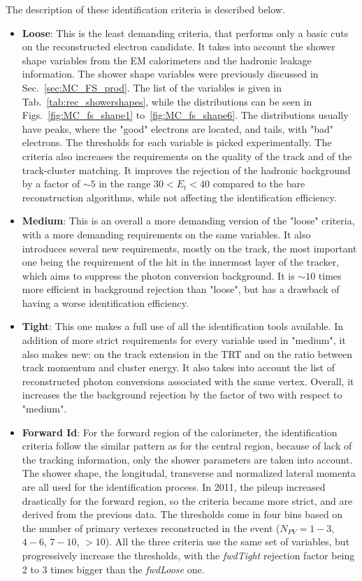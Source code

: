The description of these identification criteria is described below.
\begin{itemize}
\item {\bfseries Loose}: This is the least demanding criteria, that performs only a basic cuts on the reconstructed electron candidate. It takes into account the shower shape variables from the EM calorimeters and the hadronic leakage information. The shower shape variables were previously discussed in Sec.~\ref{sec:MC_FS_prod}. The list of the variables is given in Tab.~\ref{tab:rec_showershapes}, while the distributions can be seen in Figs.~\ref{fig:MC_fs_shape1} to~\ref{fig:MC_fs_shape6}. The distributions usually have peaks, where the "good" electrons are located, and tails, with "bad" electrons. The thresholds for each variable is picked experimentally. The criteria also increases the requirements on the quality of the track and of the track-cluster matching. It improves the rejection of the hadronic background by a factor of $\sim 5$ in the range $30 < E_{t} < 40$ compared to the bare reconstruction algorithms, while not affecting the identification efficiency.
\item {\bfseries Medium}: This is an overall a more demanding version of the "loose" criteria, with a more demanding requirements on the same variables. It also introduces several new requirements, mostly on the track, the most important one being the requirement of the hit in the innermost layer of the tracker, which aims to suppress the photon conversion background. It is $\sim 10$ times more efficient in background rejection than "loose", but has a drawback of having a worse identification efficiency.
\item {\bfseries Tight}: This one makes a full use of all the identification tools available. In addition of more strict requirements for every variable used in "medium", it also makes new: on the track extension in the TRT and on the ratio between track momentum and cluster energy. It also takes into account the list of reconstructed photon conversions associated with the same vertex. Overall, it increases the the background rejection by the factor of two with respect to "medium".
\item {\bfseries Forward Id}: For the forward region of the calorimeter, the identification criteria follow the similar pattern as for the central region, because of lack of the tracking information, only the shower parameters are taken into account. The shower shape, the longitudal, transverse and normalized lateral momenta are all used for the identification process. In 2011, the pileup increased drastically for the forward region, so the criteria became more strict, and are derived from the previous data. The thresholds come in four bins based on the number of primary vertexes reconstructed in the event ($N_{PV} = 1-3$, $4-6$, $7-10$, $>10$). All the three criteria use the same set of variables, but progressively increase the thresholds, with the {\itshape fwdTight} rejection factor being 2 to 3 times bigger than the {\itshape fwdLoose} one.
\end{itemize}

